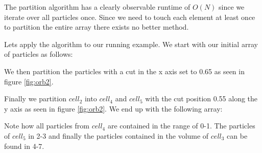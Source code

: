 \documentclass[]{article}
\begin{document}
The partition algorithm has a clearly observable runtime of $O(N)$ since we iterate over all particles once. Since we need to touch each element at least once to partition the entire array there exists no better method.

Lets apply the algorithm to our running example. We start with our initial array of particles as follows:

\begin{figure}[H]
	\begin{center}
	\end{center}
\end{figure}

We then partition the particles with a cut in the x axis set to 0.65 as seen in figure \ref{fig:orb2}.

\begin{figure}[H]
	\begin{center}
	\end{center}
\end{figure}

Finally we partition $cell_2$ into $cell_4$ and $cell_5$ with the cut position 0.55 along the y axis as seen in figure \ref{fig:orb2}. We end up with the following array:

\begin{figure}[H]
	\begin{center}
	\end{center}
\end{figure}

Note how all particles from $cell_4$ are contained in the range of 0-1. The particles of $cell_5$ in 2-3 and finally the particles contained in the volume of $cell_3$ can be found in 4-7.
\end{document}
